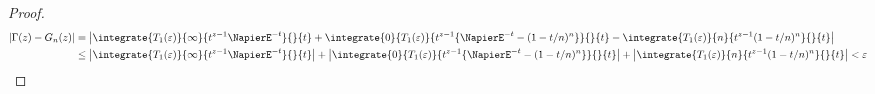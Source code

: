 \begin{proof}
                \begin{align*}
                    \left|\Gamma(z) - G_n(z)\right| &= \left|\integrate{T_1(\varepsilon)}{\infty}{t^{z-1}\NapierE^{-t}}{}{t} + \integrate{0}{T_1(\varepsilon)}{t^{z-1}\{\NapierE^{-t} - (1-t/n)^n\}}{}{t} - \integrate{T_1(\varepsilon)}{n}{t^{z-1}(1-t/n)^n}{}{t}\right| \\
                    &\leq \left|\integrate{T_1(\varepsilon)}{\infty}{t^{z-1}\NapierE^{-t}}{}{t}\right| + \left|\integrate{0}{T_1(\varepsilon)}{t^{z-1}\{\NapierE^{-t} - (1-t/n)^n\}}{}{t}\right| + \left|\integrate{T_1(\varepsilon)}{n}{t^{z-1}(1-t/n)^n}{}{t}\right| < \varepsilon
                \end{align*}
            \end{proof}